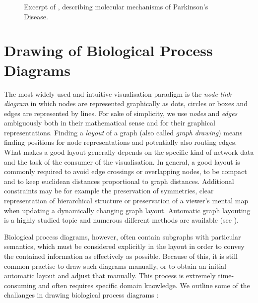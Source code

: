 \documentclass[
	fontsize=10pt, %
	twoside=false, %
	secnumdepth=1, %
  toc=indentunnumbered %
]{kaobook}
\begin{document}

\begin{figure}[h]
  \centering
  \caption[Excerpt of \PDMap (Parkinson's Disease)]{Excerpt of \PDMap
    \cite{fujita_IntegratingPathwaysParkinson_2014}, describing molecular
    mechanisms of Parkinson's Disease.}
  \label{fig:pdmap-example}
\end{figure}



\section{Drawing of Biological Process Diagrams}
\label{sec:draw-biol-netw}

The most widely used and intuitive visualisation paradigm is the
\textit{node-link diagram} in which nodes are represented graphically as dots,
circles or boxes and edges are represented by lines. For sake of simplicity, we
use \textit{nodes} and \textit{edges} ambiguously both in their mathematical
sense and for their graphical representations.
%
Finding a \textit{layout} of a graph (also called \textit{graph drawing}) means
finding positions for node representations and potentially also routing edges.
%
What makes a good layout generally depends on the specific kind of network data and the
task of the consumer of the visualisation.
%
In general, a good layout is commonly required to avoid edge crossings or
overlapping nodes, to be compact and to keep euclidean distances proportional to
graph distances.
Additional constraints may be for example the preservation of symmetries, clear
representation of hierarchical structure or preservation of a viewer's mental map when
updating a dynamically changing graph layout.
%
Automatic graph layouting is a highly studied topic and numerous different
methods are available (see ).

Biological process diagrams, however, often contain subgraphs with particular
semantics, which must be considered explicitly in the layout in order to convey
the contained information as effectively as possible.
Because of this, it is still common practise to draw such diagrams manually,
or to obtain an initial automatic layout and adjust that manually. This process is
extremely time-consuming and often requires specific domain knowledge.
We outline some of the challanges in drawing biological process diagrams
\cite{bourqui_MetabolicNetworkVisualization_2007,
  siebenhaller_HumanlikeLayoutAlgorithms_2020,
  wu_MetabopolisScalableNetwork_2019}:
\end{document}
